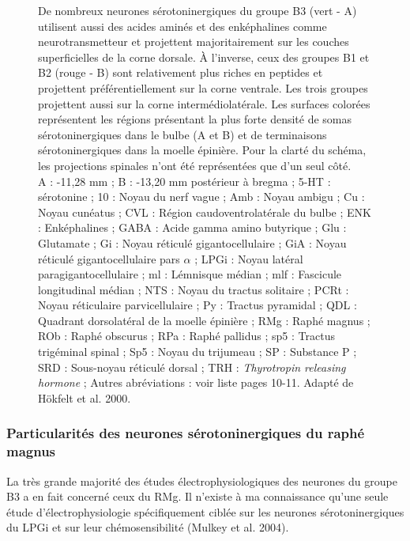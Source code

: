\documentclass[a4paper,12pt,twoside]{report}
\begin{document}
\begin{figure}[p]
{\protect\parbox[t]{18cm}{
\begin{small}
De nombreux neurones sérotoninergiques du groupe B3 (vert - A) utilisent aussi des acides aminés et des enképhalines comme neurotransmetteur et projettent majoritairement sur les couches superficielles de la corne dorsale. À l’inverse, ceux des groupes B1 et B2 (rouge - B) sont relativement plus riches en peptides et projettent préférentiellement sur la corne ventrale. Les trois groupes projettent aussi sur la corne intermédiolatérale. Les surfaces colorées représentent les régions présentant la plus forte densité de somas sérotoninergiques dans le bulbe (A et B) et de terminaisons sérotoninergiques dans la moelle épinière. Pour la clarté du schéma, les projections spinales n’ont été représentées que d’un seul côté.\\
A : -11,28 mm ; B : -13,20 mm postérieur à bregma ; 5-HT : sérotonine ; 10 : Noyau du nerf vague ; Amb : Noyau ambigu ; Cu : Noyau cunéatus ; CVL : Région caudoventrolatérale du bulbe ; ENK : Enképhalines ; GABA : Acide gamma amino butyrique ; Glu : Glutamate ; Gi : Noyau réticulé gigantocellulaire ; GiA : Noyau réticulé gigantocellulaire pars $\alpha$ ; LPGi : Noyau latéral paragigantocellulaire ; ml : Lémnisque médian ; mlf : Fascicule longitudinal médian ; NTS : Noyau du tractus solitaire ; PCRt : Noyau réticulaire parvicellulaire ; Py : Tractus pyramidal ; QDL : Quadrant dorsolatéral de la moelle épinière ; RMg : Raphé magnus ; ROb : Raphé obscurus ; RPa : Raphé pallidus ; sp5 : Tractus trigéminal spinal ; Sp5 : Noyau du trijumeau ; SP : Substance P ; SRD : Sous-noyau réticulé dorsal ; TRH : \textit{Thyrotropin releasing hormone} ; Autres abréviations : voir liste pages 10-11. Adapté de Hökfelt et al. 2000.
\end{small}}}

\label{Figure 5}

\end{figure}

\clearpage

\subsubsection{Particularités des neurones sérotoninergiques du raphé magnus}

La très grande majorité des études électrophysiologiques des neurones du groupe B3 a en fait concerné ceux du RMg. Il n’existe à ma connaissance qu’une seule étude d’électrophysiologie spécifiquement ciblée sur les neurones sérotoninergiques du LPGi et sur leur chémosensibilité (Mulkey et al. 2004).
\end{document}
